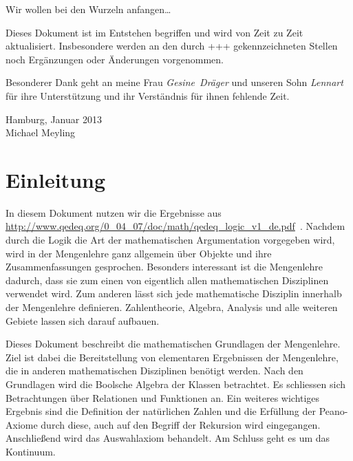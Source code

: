 \documentclass[a4paper,german,10pt,twoside]{book}
\theoremstyle{definition}
\theoremstyle{remark}
\begin{document}
\par
Wir wollen bei den Wurzeln anfangen\ldots

\par
Dieses Dokument ist im Entstehen begriffen und wird von Zeit zu Zeit aktualisiert. Insbesondere werden an den durch {\glqq+++\grqq} gekennzeichneten Stellen noch Erg{\"a}nzungen oder {\"A}nderungen vorgenommen.

\par
Besonderer Dank geht an meine Frau \emph{Gesine~Dr{\"a}ger} und unseren Sohn \emph{Lennart} f{\"u}r ihre Unterst{\"u}tzung und ihr Verst{\"a}ndnis f{\"u}r ihnen fehlende Zeit.

\par
\vspace*{1cm} Hamburg, Januar 2013 \\
\hspace*{\fill} Michael Meyling


\chapter*{Einleitung\label{ch:introduction}} \label{chapter2} \hypertarget{chapter2}{}

In diesem Dokument nutzen wir die Ergebnisse aus \url{http://www.qedeq.org/0_04_07/doc/math/qedeq_logic_v1_de.pdf}~\cite{l}.
Nachdem durch die Logik die Art der mathematischen Argumentation vorgegeben wird, wird in der Mengenlehre ganz allgemein {\"u}ber Objekte und ihre Zusammenfassungen gesprochen. Besonders interessant ist die Mengenlehre dadurch, dass sie zum einen von eigentlich allen mathematischen Disziplinen verwendet wird. Zum anderen l{\"a}sst sich jede mathematische Disziplin innerhalb der Mengenlehre definieren. Zahlentheorie, Algebra, Analysis und alle weiteren Gebiete lassen sich darauf aufbauen.
        
\par
Dieses Dokument beschreibt die mathematischen Grundlagen der Mengenlehre. Ziel ist dabei die Bereitstellung von elementaren Ergebnissen der Mengenlehre, die in anderen mathematischen Disziplinen ben{\"o}tigt werden. Nach den Grundlagen wird die Boolsche Algebra der Klassen betrachtet. Es schliessen sich Betrachtungen {\"u}ber Relationen und Funktionen an. Ein weiteres wichtiges Ergebnis sind die Definition der nat{\"u}rlichen Zahlen und die Erf{\"u}llung der Peano-Axiome durch diese, auch auf den Begriff der Rekursion wird eingegangen. Anschlie{\ss}end wird das Auswahlaxiom behandelt. Am Schluss geht es um das Kontinuum.
         
\end{document}
